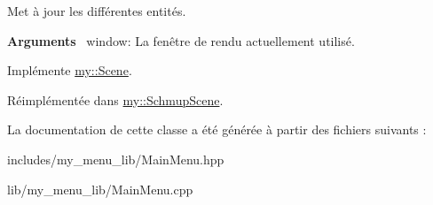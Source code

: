 Met à jour les différentes entités. 

{\bfseries Arguments}~\newline
 window\+: La fenêtre de rendu actuellement utilisé. 

Implémente \hyperlink{classmy_1_1Scene_ae9799de62a6daa9650e040f9f17c78df}{my\+::\+Scene}.



Réimplémentée dans \hyperlink{classmy_1_1SchmupScene_ad07d5b2302f0a4250150d51fdcfa1c0b}{my\+::\+Schmup\+Scene}.



La documentation de cette classe a été générée à partir des fichiers suivants \+:\begin{DoxyCompactItemize}
\item 
includes/my\+\_\+menu\+\_\+lib/Main\+Menu.\+hpp\item 
lib/my\+\_\+menu\+\_\+lib/Main\+Menu.\+cpp\end{DoxyCompactItemize}
